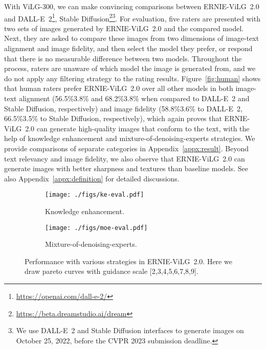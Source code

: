 \documentclass[10pt,twocolumn,letterpaper]{article}
\begin{document}
With ViLG-300, we can make convincing comparisons between ERNIE-ViLG~2.0 and DALL-E~2\footnote{\url{https://openai.com/dall-e-2/}}, Stable Diffusion\footnote{\url{https://beta.dreamstudio.ai/dream}}\footnote{We use DALL-E~2 and Stable Diffusion interfaces to generate images on October 25, 2022, before the CVPR 2023 submission deadline.}.
For evaluation, five raters are presented with two sets of images generated by ERNIE-ViLG~2.0 and the compared model.
Next, they are asked to compare these images from two dimensions of image-text alignment and image fidelity, and then select the model they prefer, or respond that there is no measurable difference between two models. 
Throughout the process, raters are unaware of which model the image is generated from, and we do not apply any filtering strategy to the rating results.
Figure~\ref{fig:human} shows that human raters prefer ERNIE-ViLG~2.0 over all other models in both image-text alignment (56.5\%3.8\% and 68.2\%3.8\% when compared to DALL-E~2 and Stable Diffusion, respectively) and image fidelity (58.8\%3.6\% to DALL-E~2,  66.5\%3.5\% to Stable Diffusion, respectively), which again proves that ERNIE-ViLG~2.0 can generate high-quality images that conform to the text, with the help of knowledge enhancement and mixture-of-denoising-experts strategies.
We provide comparisons of separate categories in Appendix~\ref{appx:result}.
Beyond text relevancy and image fidelity, we also observe that ERNIE-ViLG~2.0 can generate images with better sharpness and textures than baseline models. 
See also Appendix~\ref{appx:definition} for detailed discussions.

\begin{figure}
  \centering
  \begin{subfigure}{0.48\linewidth}
    \texttt{[image: ./figs/ke-eval.pdf]}
    \caption{Knowledge enhancement.}
    \label{fig:ke_eval}
  \end{subfigure}
  \begin{subfigure}{0.48\linewidth}
    \texttt{[image: ./figs/moe-eval.pdf]}
    \caption{Mixture-of-denoising-experts.}
    \label{fig:moe_eval}
  \end{subfigure}
  \caption{Performance with various strategies in ERNIE-ViLG~2.0. Here we draw pareto curves with guidance scale [2,3,4,5,6,7,8,9].}
  \label{fig:ablation}
\end{figure}
\end{document}
